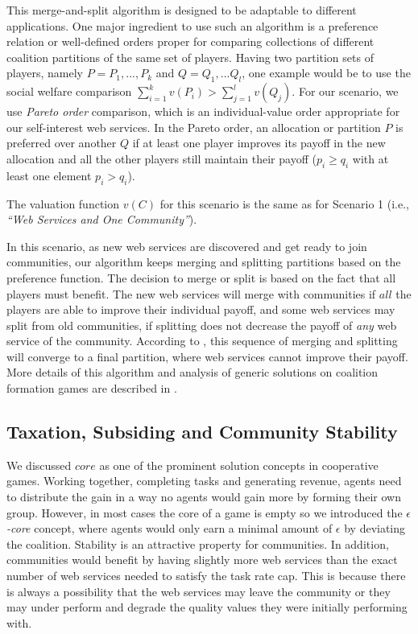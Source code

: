 \documentclass[10pt,journal,cspaper,compsoc]{IEEEtran}
\begin{document}
This merge-and-split algorithm is designed to be adaptable to
different applications. One major ingredient to use such an
algorithm is a preference relation or well-defined orders proper
for comparing collections of different coalition partitions of the
same set of players. Having two partition sets of players, namely
$P = {P_1,...,P_k}$ and $Q = {Q_1,...Q_l}$, one example would be
to use the social welfare comparison $\sum^k_{i=1}v(P_i) >
\sum^l_{j=1}v(Q_j)$. For our scenario, we use \emph{Pareto order}
comparison, which is an individual-value order appropriate for our
self-interest web services. In the Pareto order, an allocation or
partition $P$ is preferred over another $Q$ if at least one player
improves its payoff in the new allocation and all the other
players still maintain their payoff ($p_i \geq q_i$ with at least
one element $p_i > q_i$).

The valuation function $v(C)$ for this scenario is the same as for
Scenario 1 (i.e., \emph{``Web Services and One Community''}).

In this scenario, as new web services are discovered and get ready
to join communities, our algorithm keeps merging and splitting
partitions based on the preference function. The decision to merge
or split is based on the fact that all players must benefit. The
new web services will merge with communities if $all$ the players
are able to improve their individual payoff, and some web services
may split from old communities, if splitting does not decrease the
payoff of \emph{any} web service of the community. According to
\cite{DBLP:journals/corr/abs-cs-0605132}, this sequence of merging
and splitting will converge to a final partition, where web
services cannot improve their payoff. More details of this
algorithm and analysis of generic solutions on coalition formation
games are described in \cite{DBLP:journals/igtr/AptW09}.

\subsection{Taxation, Subsiding and Community Stability}\label{s:tax}

We discussed $core$ as one of the prominent solution concepts in
cooperative games. Working together, completing tasks and
generating revenue, agents need to distribute the gain in a way no
agents would gain more by forming their own group. However, in most
cases the core of a game is empty so we introduced the
\emph{$\epsilon$-core} concept, where agents would only earn a
minimal amount of $\epsilon$ by deviating the coalition. Stability is an
attractive property for communities. In addition, communities
would benefit by having slightly more web services than the exact
number of web services needed to satisfy the task rate cap. This
is because there is always a possibility that the web services may
leave the community or they may under perform and degrade the
quality values they were initially performing with.
\end{document}
